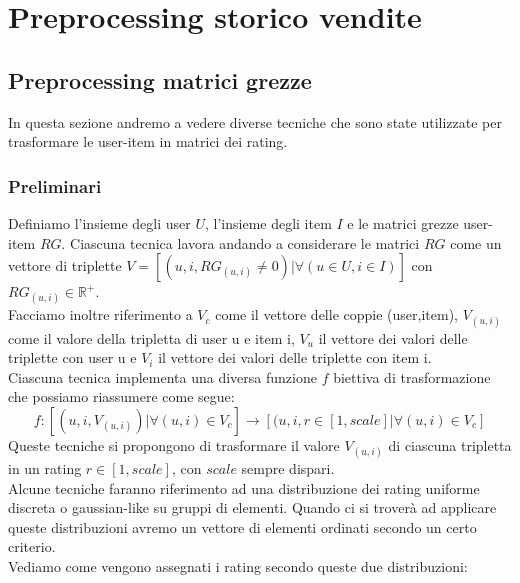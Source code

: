 
\hypertarget{(chap:capitolo4)}{}
\chapter{Preprocessing storico vendite}

\section{Preprocessing matrici grezze}
In questa sezione andremo a vedere diverse tecniche che sono state utilizzate per trasformare le  user-item in matrici dei rating.\\

\subsection{Preliminari}
Definiamo l'insieme degli user $U$, l'insieme degli item $I$ e le matrici grezze user-item $RG$.
Ciascuna tecnica lavora andando a considerare le matrici $RG$ come un vettore di triplette $V = [(u, i, RG_{(u,i)} \neq 0) |  \forall (u \in U,i \in I)]$ con $RG_{(u,i)} \in \mathbb{R^+}$.\\
Facciamo inoltre riferimento a $V_c$ come il vettore delle coppie (user,item), $V_{(u,i)}$ come il valore della tripletta di user u e item i, $V_u$ il vettore dei valori delle triplette con user u e $V_i$ il vettore dei valori delle triplette con item i.\\
Ciascuna tecnica implementa una diversa funzione $f$ biettiva di trasformazione che possiamo riassumere come segue:
$$f: [(u, i, V_{(u,i)}) |  \forall (u,i) \in V_c] \rightarrow [(u, i, r \in [1,scale] | \forall (u,i) \in V_c]$$
Queste tecniche si propongono di trasformare il valore $V_{(u,i)}$ di ciascuna tripletta in un rating $r \in [1,scale]$, con $scale$ sempre dispari.\\ 
Alcune tecniche faranno riferimento ad una distribuzione dei rating uniforme discreta o gaussian-like su gruppi di elementi. Quando ci si troverà ad applicare queste distribuzioni avremo un vettore di elementi ordinati secondo un certo criterio.\\
Vediamo come vengono assegnati i rating secondo queste due distribuzioni:
